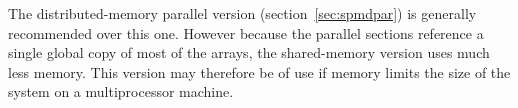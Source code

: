\documentclass[a4paper,twoside]{report}
\newcommand{\Fname}[1]{{\upshape\mdseries\sffamily#1}}
\newcommand{\ie}{\emph{i.e.}}
\begin{document}
The distributed-memory parallel version (section~\ref{sec:spmdpar}) is
generally recommended over this one.  However because the parallel
sections reference a single global copy of most of the arrays, the
shared-memory version uses much less memory.  This version may
therefore be of use if memory limits the size of the system on 
a multiprocessor machine.

% 
% 
% 
\end{document}
